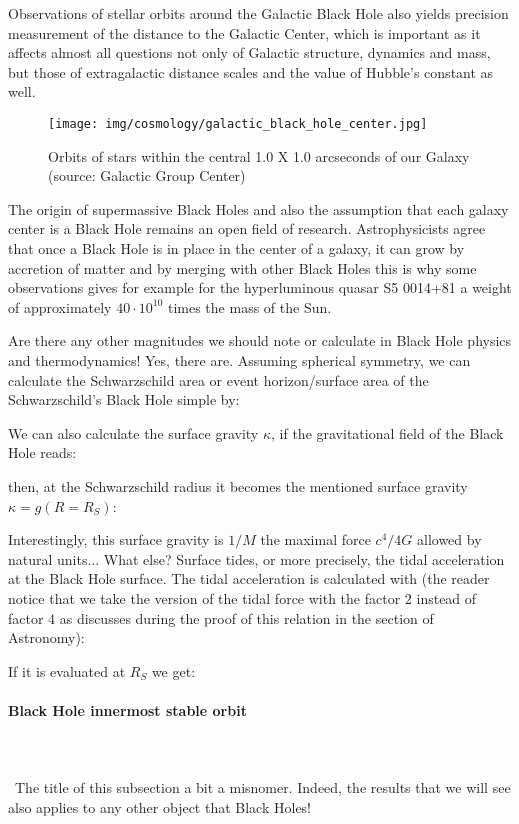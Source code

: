 	Observations of stellar orbits around the Galactic Black Hole also yields precision measurement of the distance to the Galactic Center, which is important as it affects almost all questions not only of Galactic structure, dynamics and mass, but those of extragalactic distance scales and the value of Hubble's constant as well.
	\begin{figure}[H]
		\centering
		\texttt{[image: img/cosmology/galactic\_black\_hole\_center.jpg]}	
		\caption[Orbits of stars within the central 1.0 X 1.0 arcseconds of our Galaxy]{Orbits of stars within the central 1.0 X 1.0 arcseconds of our Galaxy (source: Galactic Group Center)}
	\end{figure}
	The origin of supermassive Black Holes and also the assumption that each galaxy center is a Black Hole remains an open field of research. Astrophysicists agree that once a Black Hole is in place in the center of a galaxy, it can grow by accretion of matter and by merging with other Black Holes this is why some observations gives for example for the hyperluminous quasar S5 0014+81 a weight of approximately $40\cdot 10^10$ times the mass of the Sun.
	
	Are there any other magnitudes we should note or calculate in Black Hole physics and thermodynamics! Yes, there are. Assuming spherical symmetry, we can calculate the Schwarzschild area or event horizon/surface area of the Schwarzschild's Black Hole simple by:
   
	We can also calculate the surface gravity $\kappa$, if the gravitational field of the Black Hole reads:
	
	then, at the Schwarzschild radius it becomes the mentioned surface gravity $\kappa=g(R=R_S)$:
	
	Interestingly, this surface gravity is $1/M$ the maximal force $c^4/4G$ allowed by natural units... What else? Surface tides, or more precisely, the tidal acceleration at the Black Hole surface. The tidal acceleration is calculated with (the reader notice that we take the version of the tidal force with the factor $2$ instead of factor $4$ as discusses during the proof of this relation in the section of Astronomy):
	
	If it is evaluated at $R_S$ we get:
	
	
	\paragraph{Black Hole innermost stable orbit}\mbox{}\\\\\
	The title of this subsection a bit a misnomer. Indeed, the results that we will see also applies to any other object that Black Holes!
	
